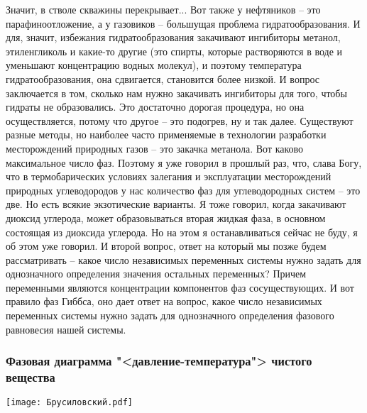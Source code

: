 \documentclass[main.tex]{subfiles}
\begin{document}
Значит, в стволе скважины перекрывает...
Вот также у нефтяников -- это парафиноотложение, а у газовиков -- большущая проблема гидратообразования.
И для, значит, избежания гидратообразования закачивают ингибиторы метанол, этиленгликоль и какие-то другие (это спирты, которые растворяются в воде и уменьшают концентрацию водных молекул), и поэтому температура гидратообразования, она сдвигается, становится более низкой.
И вопрос заключается в том, сколько нам нужно закачивать ингибиторы для того, чтобы гидраты не образовались.
Это достаточно дорогая процедура, но она осуществляется, потому что другое -- это подогрев, ну и так далее.
Существуют разные методы, но наиболее часто применяемые в технологии разработки месторождений природных газов -- это закачка метанола.
Вот каково максимальное число фаз.
Поэтому я уже говорил в прошлый раз, что, слава Богу, что в термобарических условиях залегания и эксплуатации месторождений природных углеводородов у нас количество фаз для углеводородных систем -- это две.
Но есть всякие экзотические варианты.
Я тоже говорил, когда закачивают диоксид углерода, может образовываться вторая жидкая фаза, в основном состоящая из диоксида углерода.
Но на этом я останавливаться сейчас не буду, я об этом уже говорил.
И второй вопрос, ответ на который мы позже будем рассматривать -- какое число независимых переменных системы нужно задать для однозначного определения значения остальных переменных?
Причем переменными являются концентрации компонентов фаз сосуществующих.
И вот правило фаз Гиббса, оно дает ответ на вопрос, какое число независимых переменных системы нужно задать для однозначного определения фазового равновесия нашей системы.

\subsubsection{Фазовая диаграмма "<давление-температура"> чистого вещества}

\begin{center}
\texttt{[image: Брусиловский.pdf]}
\end{center}
\end{document}

